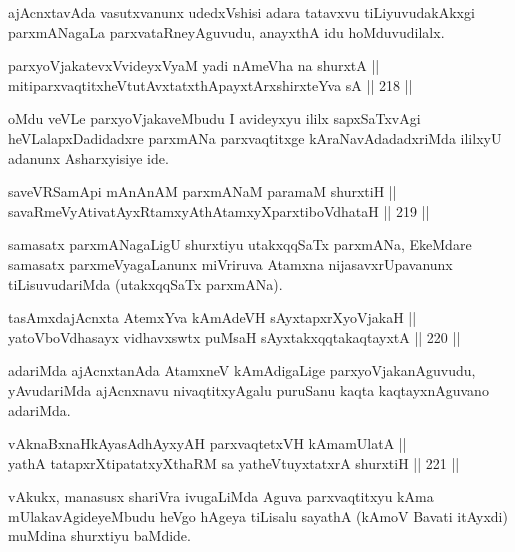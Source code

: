 \begin{artha}
ajAcnxtavAda vasutxvanunx udedxVshisi adara tatavxvu tiLiyuvudakAkxgi
parxmANagaLa parxvataRneyAguvudu, anayxthA idu hoMduvudilalx.
\end{artha}

\begin{shl}
parxyoVjakatevxV\s videyxVyaM yadi nAmeVha na shurxtA || \\
mitiparxvaqtitxheVtutAvxtatxthA\s payxtArx\s \s shirxteYva sA \hfill || 218 ||  
\end{shl}

\begin{artha}
oMdu veVLe parxyoVjakaveMbudu I avideyxyu ililx sapxSaTxvAgi
heVLalapxDadidadxre parxmANa parxvaqtitxge kAraNavAdadadxriMda ililxyU
adanunx Asharxyisiye ide.
\end{artha}

\begin{shl}
saveVRSamApi mAnAnAM parxmANaM paramaM shurxtiH || \\
savaRmeVyAtivatAyxRtamxyAthAtamxyXparxtiboVdhataH \hfill || 219 ||  
\end{shl}

\begin{artha}
samasatx parxmANagaLigU shurxtiyu utakxqqSaTx parxmANa, EkeMdare
samasatx parxmeVyagaLanunx miVriruva Atamxna nijasavxrUpavanunx
tiLisuvudariMda (utakxqqSaTx parxmANa).
\end{artha}

\begin{shl}
tasAmxdajAcnxta AtemxYva kAmAdeVH sAyxtapxrXyoVjakaH || \\
yatoV\s boVdhasayx vidhavxswtx puMsaH sAyxtakxqqtakaqtayxtA \hfill || 220 ||  
\end{shl}

\begin{artha}
adariMda ajAcnxtanAda AtamxneV kAmAdigaLige parxyoVjakanAguvudu,
yAvudariMda ajAcnxnavu nivaqtitxyAgalu puruSanu kaqta kaqtayxnAguvano
adariMda.
\end{artha}


\begin{shl}
vAknaBxnaHkAyasAdhAyxyAH parxvaqtetxVH kAmamUlatA || \\
yathA tatapxrXtipatatxyXthaRM sa yatheVtuyxtatxrA shurxtiH \hfill || 221 ||  
\end{shl}

\begin{artha}
vAkukx, manasusx shariVra ivugaLiMda Aguva parxvaqtitxyu kAma
mUlakavAgideyeMbudu heVgo hAgeya tiLisalu sayathA (kAmoV Bavati
itAyxdi) muMdina shurxtiyu baMdide.
\end{artha}

